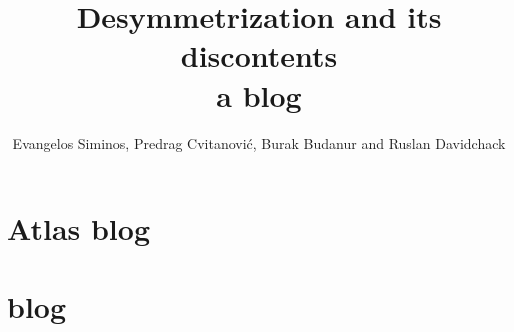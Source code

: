 \documentclass[10pt,openany]{book}
\title{Desymmetrization and its discontents
       \\ \Huge a blog}
\author{Evangelos Siminos,
        Predrag Cvitanovi\'{c}, Burak Budanur and
        Ruslan Davidchack}
\begin{document}
\maketitle

\tableofcontents





    \newpage






    \chapter{Atlas  blog}
    \label{chap:atlas}


    \chapter{{\twoMode} blog}
    \label{chap:2modes}







\newpage
% 
% 




\end{document}
